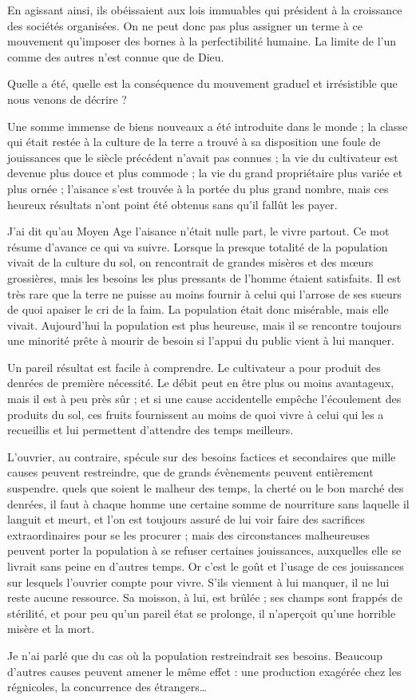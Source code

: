 \documentclass[french,twoside]{book} %
\begin{document}
\noindent En agissant ainsi, ils obéissaient aux lois immuables qui président à la croissance des sociétés organisées. On ne peut donc pas plus assigner un terme à ce mouvement qu’imposer des bornes à la perfectibilité humaine. La limite de l’un comme des autres n’est connue que de Dieu.\par
Quelle a été, quelle est la conséquence du mouvement graduel et irrésistible que nous venons de décrire ?\par
Une somme immense de biens nouveaux a été introduite dans le monde ; la classe qui était restée à la culture de la terre a trouvé à sa disposition une foule de jouissances que le siècle précédent n’avait pas connues ; la vie du cultivateur est devenue plus douce et plus commode ; la vie du grand propriétaire plus variée et plus ornée ; l’aisance s’est trouvée à la portée du plus grand nombre, mais ces heureux résultats n’ont point été obtenus sans qu’il fallût les payer.\par
J'ai dit qu’au Moyen Age l’aisance n’était nulle part, le vivre partout. Ce mot résume d’avance ce qui va suivre. Lorsque la presque totalité de la population vivait de la culture du sol, on rencontrait de grandes misères et des mœurs grossières, mais les besoins les plus pressants de l’homme étaient satisfaits. Il est très rare que la terre ne puisse au moins fournir à celui qui l’arrose de ses sueurs de quoi apaiser le cri de la faim. La population était donc misérable, mais elle vivait. Aujourd’hui la population est plus heureuse, mais il se rencontre toujours une minorité prête à mourir de besoin si l’appui du public vient à lui manquer.\par
Un pareil résultat est facile à comprendre. Le cultivateur a pour produit des denrées de première nécessité. Le débit peut en être plus ou moins avantageux, mais il est à peu près sûr ; et si une cause accidentelle empêche l’écoulement des produits du sol, ces fruits fournissent au moins de quoi vivre à celui qui les a recueillis et lui permettent d’attendre des temps meilleurs.\par
L'ouvrier, au contraire, spécule sur des besoins factices et secondaires que mille causes peuvent restreindre, que de grands évènements peuvent entièrement suspendre. quels que soient le malheur des temps, la cherté ou le bon marché des denrées, il faut à chaque homme une certaine somme de nourriture sans laquelle il languit et meurt, et l’on est toujours assuré de lui voir faire des sacrifices extraordinaires pour se les procurer ; mais des circonstances malheureuses peuvent porter la population à se refuser certaines jouissances, auxquelles elle se livrait sans peine en d’autres temps. Or c’est le goût et l’usage de ces jouissances sur lesquels l’ouvrier compte pour vivre. S'ils viennent à lui manquer, il ne lui reste aucune ressource. Sa moisson, à lui, est brûlée ; ses champs sont frappés de stérilité, et pour peu qu’un pareil état se prolonge, il n’aperçoit qu’une horrible misère et la mort.\par
Je n’ai parlé que du cas où la population restreindrait ses besoins. Beaucoup d’autres causes peuvent amener le même effet : une production exagérée chez les régnicoles, la concurrence des étrangers…\par
\end{document}
